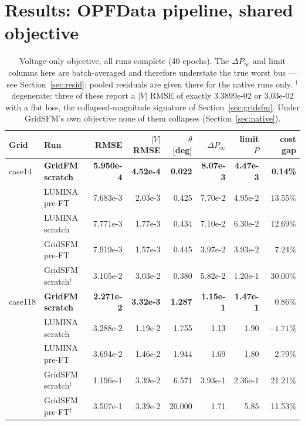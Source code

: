 \documentclass[10pt]{article}
\begin{document}
\section{Results: OPFData pipeline, shared objective}

\begin{table}[H]
\centering
\small
\begin{tabular}{llrrrrrr}
\toprule
Grid & Run & RMSE & \(|V|\) RMSE & \(\theta\) [deg] & \(\Delta P_\infty\) & limit \(P\) & cost gap \\
\midrule
case14 & \textbf{GridFM scratch} & \textbf{5.950e-4} & \textbf{4.52e-4} & \textbf{0.022} & \textbf{8.07e-3} & \textbf{4.47e-3} & \textbf{0.14\%} \\
       & LUMINA pre-FT          & 7.683e-3 & 2.03e-3 & 0.425 & 7.70e-2 & 4.95e-2 & 13.55\% \\
       & LUMINA scratch         & 7.771e-3 & 1.77e-3 & 0.434 & 7.10e-2 & 6.30e-2 & 12.69\% \\
       & GridSFM pre-FT         & 7.919e-3 & 1.57e-3 & 0.445 & 3.97e-2 & 3.93e-2 & 7.24\% \\
       & GridSFM scratch$^{\dagger}$ & 3.105e-2 & 3.03e-2 & 0.380 & 5.82e-2 & 1.20e-1 & 30.00\% \\
\midrule
case118 & \textbf{GridFM scratch} & \textbf{2.271e-2} & \textbf{3.32e-3} & \textbf{1.287} & \textbf{1.15e-1} & \textbf{1.47e-1} & 0.86\% \\
        & LUMINA scratch         & 3.288e-2 & 1.19e-2 & 1.755 & 1.13 & 1.90 & \(-1.71\%\) \\
        & LUMINA pre-FT          & 3.694e-2 & 1.46e-2 & 1.944 & 1.69 & 1.80 & 2.79\% \\
        & GridSFM scratch$^{\dagger}$ & 1.196e-1 & 3.39e-2 & 6.571 & 3.93e-1 & 2.36e-1 & 21.21\% \\
        & GridSFM pre-FT$^{\dagger}$  & 3.507e-1 & 3.39e-2 & 20.000 & 1.71 & 5.85 & 11.53\% \\
\bottomrule
\end{tabular}
\caption{Voltage-only objective, all runs complete (40 epochs). The
\(\Delta P_\infty\) and limit columns here are batch-averaged and therefore
understate the true worst bus --- see Section~\ref{sec:resid}; pooled residuals
are given there for the native runs only.
$^{\dagger}$degenerate: three of these report a \(|V|\) RMSE of exactly
3.3899e-02 or 3.03e-02 with a flat loss, the collapsed-magnitude signature of
Section~\ref{sec:gridsfm}. Under GridSFM's own objective none of them collapses
(Section~\ref{sec:native}).}
\end{table}
\end{document}
